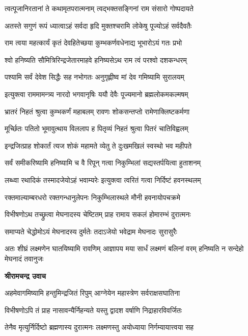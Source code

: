 \twolineshloka
{त्वत्पूजानिरतानां ते कथामृतपरात्मनाम्}
{त्वद्भक्तसङ्गिनां राम संसारो गोष्पदायते} %

\twolineshloka
{अतस्ते सगुणं रूपं ध्यात्वाऽहं सर्वदा हृदि}
{मुक्तश्चरामि लोकेषु पूज्योऽहं सर्वदैवतैः} %

\twolineshloka
{राम त्वया महत्कार्यं कृतं देवहितेच्छया}
{कुम्भकर्णवधेनाद्य भूभारोऽयं गतः प्रभो} %

\twolineshloka
{श्वो हनिष्यति सौमित्रिरिन्द्रजेतारमाहवे}
{हनिष्यसेऽथ राम त्वं परश्वो दशकन्धरम्} %

\twolineshloka
{पश्यामि सर्वं देवेश सिद्धैः सह नभोगतः}
{अनुगृह्णीष्व मां देव गमिष्यामि सुरालयम्} %

\twolineshloka
{इत्युक्त्वा राममामन्त्र्य नारदो भगवानृषिः}
{ययौ देवैः पूज्यमानो ब्रह्मलोकमकल्मषम्} %

\twolineshloka
{भ्रातरं निहतं श्रुत्वा कुम्भकर्णं महाबलम्}
{रावणः शोकसन्तप्तो रामेणाक्लिष्टकर्मणा} %

\twolineshloka
{मूर्च्छितः पतितो भूमावुत्थाय विललाप ह}
{पितृव्यं निहतं श्रुत्वा पितरं चातिविह्वलम्} %

\twolineshloka
{इन्द्रजित्प्राह शोकार्तं त्यज शोकं महामते}
{व्येतु ते दुःखमखिलं स्वस्थो भव महीपते} %

\twolineshloka
{सर्वं समीकरिष्यामि हनिष्यामि च वै रिपून्}
{गत्वा निकुम्भिलां सद्यस्तर्पयित्वा हुताशनम्} %

\twolineshloka
{लब्ध्वा रथादिकं तस्मादजेयोऽहं भवाम्यरेः}
{इत्युक्त्वा त्वरितं गत्वा निर्दिष्टं हवनस्थलम्} %

\twolineshloka
{रक्तमाल्याम्बरधरो रक्तगन्धानुलेपनः}
{निकुम्भिलास्थले मौनी हवनायोपचक्रमे} %

\twolineshloka
{विभीषणोऽथ तच्छ्रुत्वा मेघनादस्य चेष्टितम्}
{प्राह रामाय सकलं होमारम्भं दुरात्मनः} %

\twolineshloka
{समाप्यते चेद्धोमोऽयं मेघनादस्य दुर्मतेः}
{तदाऽजेयो भवेद्राम मेघनादः सुरासुरैः} %

\threelineshloka
{अतः शीघ्रं लक्ष्मणेन घातयिष्यामि रावणिम्}
{आज्ञापय मया सार्धं लक्ष्मणं बलिनां वरम्}
{हनिष्यति न सन्देहो मेघनादं तवानुजः} %

\textbf{श्रीरामचन्द्र उवाच}

\twolineshloka
{अहमेवागमिष्यामि हन्तुमिन्द्रजितं रिपुम्}
{आग्नेयेन महास्त्रेण सर्वराक्षसघातिना} %

\twolineshloka
{विभीषणोऽपि तं प्राह नासावन्यैर्निहन्यते}
{यस्तु द्वादश वर्षाणि निद्राहारविवर्जितः} %

\twolineshloka
{तेनैव मृत्युर्निर्दिष्टो ब्रह्मणास्य दुरात्मनः}
{लक्ष्मणस्तु अयोध्याया निर्गम्यायात्त्वया सह} %

